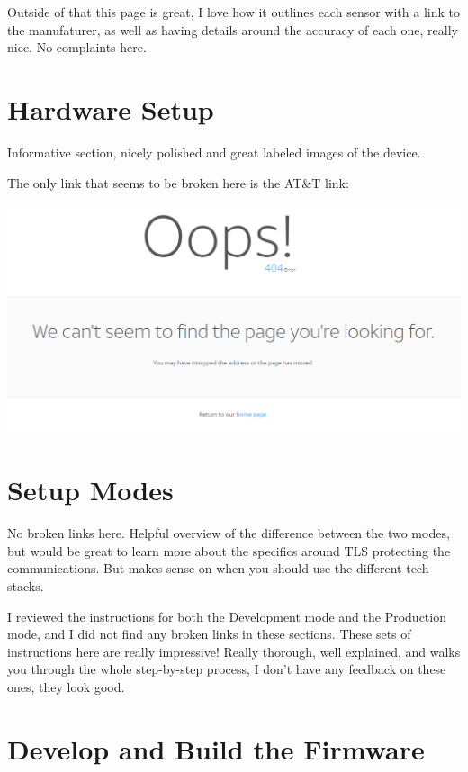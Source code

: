 \documentclass[
]{book}
\begin{document}
Outside of that this page is great, I love how it outlines each sensor
with a link to the manufaturer, as well as having details around the
accuracy of each one, really nice. No complaints here.

\hypertarget{hardware-setup}{%
\section{Hardware Setup}\label{hardware-setup}}

Informative section, nicely polished and great labeled images of the
device.

The only link that seems to be broken here is the AT\&T link:

\includegraphics{images/att_404.PNG}

\hypertarget{setup-modes}{%
\section{Setup Modes}\label{setup-modes}}

No broken links here. Helpful overview of the difference between the two
modes, but would be great to learn more about the specifics around TLS
protecting the communications. But makes sense on when you should use
the different tech stacks.

I reviewed the instructions for both the Development mode and the
Production mode, and I did not find any broken links in these sections.
These sets of instructions here are really impressive! Really thorough,
well explained, and walks you through the whole step-by-step process, I
don't have any feedback on these ones, they look good.

\hypertarget{develop-and-build-the-firmware}{%
\section{Develop and Build the
Firmware}\label{develop-and-build-the-firmware}}
\end{document}
